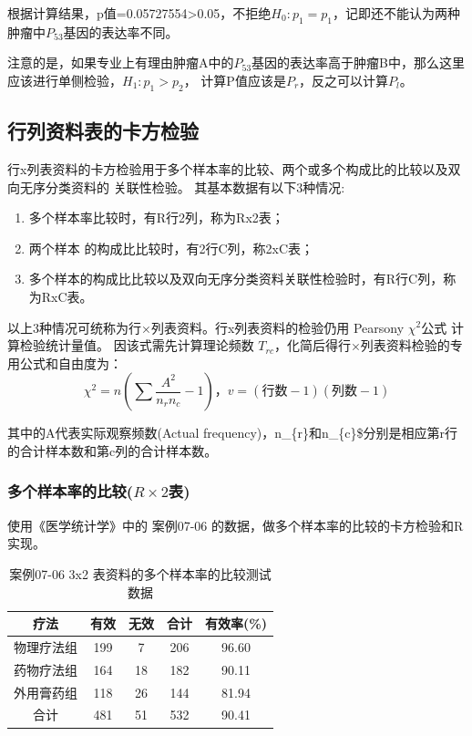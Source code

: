 \documentclass[
]{article}
\begin{document}
根据计算结果，p值=0.05727554\textgreater0.05，不拒绝\(H_0: p_1=p_1\)，记即还不能认为两种肿瘤中\(P_{53}\)基因的表达率不同。

注意的是，如果专业上有理由肿瘤A中的\(P_{53}\)基因的表达率高于肿瘤B中，那么这里应该进行单侧检验，\(H_1: p_1>p_2\)，
计算P值应该是\(P_r\)，反之可以计算\(P_l\)。

\hypertarget{ux884cux5217ux8d44ux6599ux8868ux7684ux5361ux65b9ux68c0ux9a8c}{%
\subsection{行列资料表的卡方检验}\label{ux884cux5217ux8d44ux6599ux8868ux7684ux5361ux65b9ux68c0ux9a8c}}

行x列表资料的卡方检验用于多个样本率的比较、两个或多个构成比的比较以及双向无序分类资料的 关联性检验。
其基本数据有以下3种情况:

\begin{enumerate}
\def\labelenumi{\arabic{enumi}.}
\item
  多个样本率比较时，有R行2列，称为Rx2表；
\item
  两个样本 的构成比比较时，有2行C列，称2xC表；
\item
  多个样本的构成比比较以及双向无序分类资料关联性检验时，有R行C列，称为RxC表。
\end{enumerate}

以上3种情况可统称为行×列表资料。行x列表资料的检验仍用 Pearsony \(\chi^2\)公式 计算检验统计量值。
因该式需先计算理论频数 \(T_{rc}\)，化简后得行×列表资料检验的专用公式和自由度为：
\[\chi^2=n(\sum\frac{A^2}{n_{r}n_{c}}-1)，v=(行数-1)(列数-1)\]

其中的A代表实际观察频数(Actual frequency)，n\_\{r\}\(和\)n\_\{c\}\$分别是相应第r行的合计样本数和第c列的合计样本数。

\hypertarget{ux591aux4e2aux6837ux672cux7387ux7684ux6bd4ux8f83r-times-2ux8868}{%
\subsubsection{\texorpdfstring{多个样本率的比较(\(R \times 2\)表)}{多个样本率的比较(R \textbackslash times 2表)}}\label{ux591aux4e2aux6837ux672cux7387ux7684ux6bd4ux8f83r-times-2ux8868}}

使用《医学统计学》中的 案例07-06 的数据，做多个样本率的比较的卡方检验和R实现。

\begin{table}

\caption{\label{tab:chisqtab4}案例07-06 3x2 表资料的多个样本率的比较测试数据}
\centering
\begin{tabular}[t]{ccccc}
\toprule
疗法 & 有效 & 无效 & 合计 & 有效率(\%)\\
\midrule
物理疗法组 & 199 & 7 & 206 & 96.60\\
药物疗法组 & 164 & 18 & 182 & 90.11\\
外用膏药组 & 118 & 26 & 144 & 81.94\\
合计 & 481 & 51 & 532 & 90.41\\
\bottomrule
\end{tabular}
\end{table}
\end{document}
